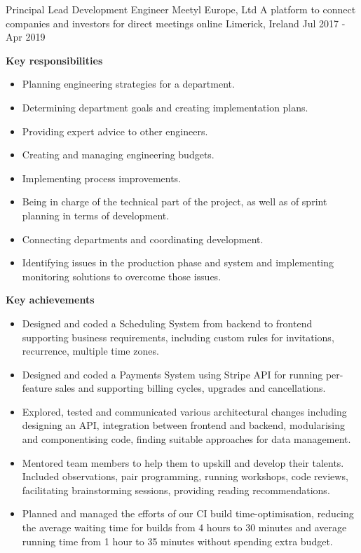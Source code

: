 \begin{cventries}
    \cventry
    {Principal Lead Development Engineer} %
    {Meetyl Europe, Ltd \textnormal{A platform to connect companies and investors for direct meetings online}} %
    {Limerick, Ireland} %
    {Jul 2017 - Apr 2019} %
    {
        \textbf{Key responsibilities}
        \begin{itemize}
            \item {Planning engineering strategies for a department.}
            \item {Determining department goals and creating implementation plans.}
            \item {Providing expert advice to other engineers.}
            \item {Creating and managing engineering budgets.}
            \item {Implementing process improvements.}
            \item {Being in charge of the technical part of the project, as well as of sprint planning in terms of development.}
            \item {Connecting departments and coordinating development.}
            \item {Identifying issues in the production phase and system and implementing monitoring solutions to overcome those issues.}
        \end{itemize}
        \textbf{Key achievements}
        \begin{itemize}
            \item {Designed and coded a Scheduling System from backend to frontend supporting business requirements, including custom rules for invitations, recurrence, multiple time zones.}
            \item {Designed and coded a Payments System using Stripe API for running per-feature sales and supporting billing cycles, upgrades and cancellations.}
            \item {Explored, tested and communicated various architectural changes including designing an API, integration between frontend and backend, modularising and componentising code, finding suitable approaches for data management.}
            \item {Mentored team members to help them to upskill and develop their talents. Included observations, pair programming, running workshops, code reviews, facilitating brainstorming sessions, providing reading recommendations.}
            \item {Planned and managed the efforts of our CI build time-optimisation, reducing the average waiting time for builds from 4 hours to 30 minutes and average running time from 1 hour to 35 minutes without spending extra budget.}

\end{itemize}}
\end{cventries}
